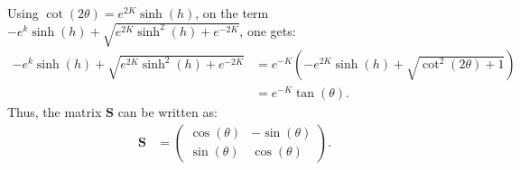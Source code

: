\documentclass[a4paper]{article}
\begin{document}
Using $\cot(2\theta) = e^{2K}\sinh(h)$, on the term $-e^{k}\sinh(h) + \sqrt{e^{2K}\sinh^2(h) + e^{-2K}}$, one gets:
\begin{align*}
    -e^{k}\sinh(h) + \sqrt{e^{2K}\sinh^2(h) + e^{-2K}} &= e^{-K}\left(-e^{2K}\sinh(h) + \sqrt{\cot^2(2\theta) + 1}\right)\\
    &=e^{-K}\tan(\theta).
\end{align*}Thus, the matrix $\mathbf{S}$ can be written as:
\begin{align*}
    \mathbf{S} &=\begin{pmatrix}
        \cos(\theta) & -\sin(\theta)\\
        \sin(\theta) &\cos(\theta)
    \end{pmatrix}.
\end{align*}

\begin{comment}
    \implies \lambda_1 - e^{K + h} v_{11} - e^{-K} v_{12} &= 0,\\
    \lambda_1 - e^{-h + K} v_{12} - e^{-K} v_{11} &= 0\\
    \implies \lambda_1 -  \frac{\lambda_1 e^{-h + K} v_{12}}{e^{-K}} - e^{-K} v_{12} &=0\\
    \implies v_{12} = \frac{\lambda_1}{\left(\lambda_1 e^{-h + 2K} + e^{-K}\right)}&\\
    \implies v_{11} = \frac{\lambda_1}{e^{-K}}\left(1 - \frac{1}{\left(\lambda_1 e^{-h + 2K} + e^{-K}\right)}\right)&
\end{align*}Now looking at the term $\lambda_1e^{-h + 2K}$, one can rewrite it as:
\begin{align*}
    \lambda_1 e^{-h + 2K} &= e^{3K -h}\left[\cosh(h) + \sqrt{\sinh^2\left(h\right) + e^{-4K}}\right]\\
    &=e^{K - h}\left[\cosh(h)e^{2K} + \sqrt{\coth^2(2\theta) + 1}\right]
\end{align*}One does similar with the second equation, and obtains:
\begin{align*}
    v_{21} &= \frac{\lambda_2}{e^{-K}}\left(1 - \frac{1}{\left(\lambda_2 e^{-h + 2K} + e^{-K}\right)}\right),\\
    v_{22} &= \frac{\lambda_2}{\left(\lambda_2 e^{-h + 2K} + e^{-K}\right)}.
\end{align*}Thus, the matrix $\mathbf{S}$ is given by:
\begin{align*}
    \mathbf{S} &= \begin{pmatrix}
        v_{11} & v_{21}\\
        v_{12} & v_{22}
    \end{pmatrix}.
\end{align*}
\end{comment}
\end{document}
